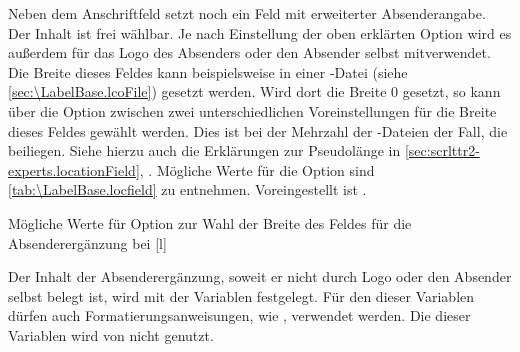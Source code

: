 \begin{Declaration}
\end{Declaration}
%
Neben dem Anschriftfeld setzt  noch ein Feld mit erweiterter
Absenderangabe. Der Inhalt ist frei wählbar.  Je nach Einstellung der
oben erklärten Option  wird es außerdem
für das Logo des Absenders oder den Absender selbst mitverwendet. Die Breite
dieses Feldes kann beispielsweise in einer -Datei (siehe
\autoref{sec:\LabelBase.lcoFile}) gesetzt werden. Wird dort die Breite 0
gesetzt, so kann über die Option  zwischen zwei
unterschiedlichen Voreinstellungen für die Breite dieses Feldes gewählt
werden. Dies ist bei der Mehrzahl der -Dateien der Fall, die
\KOMAScript{} beiliegen. Siehe hierzu auch die Erklärungen zur Pseudolänge
 in \autoref{sec:scrlttr2-experts.locationField},
. Mögliche Werte für die Option
sind \autoref{tab:\LabelBase.locfield} zu
entnehmen. Voreingestellt ist .
%
\begin{table}
  \setcapindent{0pt}%
  \begin{captionbeside}
    {Mögliche Werte für Option  zur Wahl der Breite des
      Feldes für die Absenderergänzung bei %
      \label{tab:\LabelBase.locfield}}%
    [l]
    \begin{minipage}[t]{.55\linewidth}
      \begin{desctabular}[t]
      \end{desctabular}
    \end{minipage}
  \end{captionbeside}
\end{table}

\begin{Declaration}
\end{Declaration}
Der Inhalt der Absenderergänzung, soweit er nicht durch Logo oder den Absender
selbst belegt ist, wird mit der Variablen  festgelegt. Für
den  dieser Variablen dürfen auch Formatierungsanweisungen, wie
, verwendet werden. Die  dieser Variablen
wird von \KOMAScript{} nicht genutzt.

